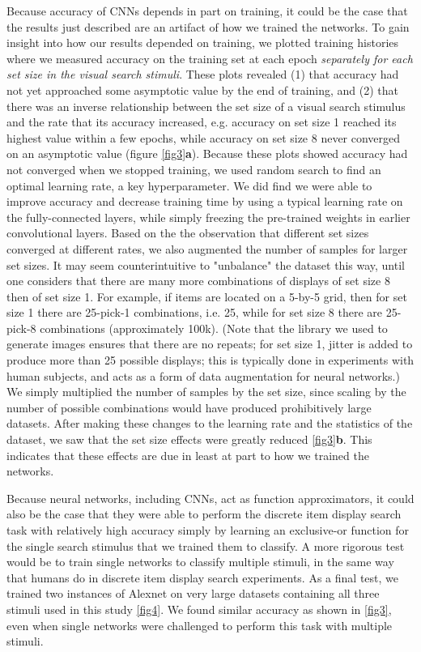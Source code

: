 \documentclass[10pt,letterpaper]{article}
\begin{document}
Because accuracy of CNNs depends in part on training, it could be the case that 
the results just described are an artifact of how we trained the networks. 
To gain insight into how our results depended on training, 
we plotted training histories where we measured accuracy on the training set 
at each epoch \emph{separately for each set size in the visual search stimuli}.
These plots revealed (1) that accuracy had not yet approached some asymptotic 
value by the end of training, and (2) that there was an inverse relationship between 
the set size of a visual search stimulus and the rate that its accuracy increased, 
e.g. accuracy on set size 1 reached its highest value within a few epochs, while accuracy on 
set size 8 never converged on an asymptotic value (figure \ref{fig3}\textbf{a}).
Because these plots showed accuracy had not converged when we stopped training, we 
used random search to find an optimal learning rate, a key hyperparameter.
We did find we were able to improve accuracy and decrease training time by 
using a typical learning rate on the fully-connected layers, while simply 
freezing the pre-trained weights in earlier convolutional layers.
Based on the the observation that different set sizes converged at different rates, we 
also augmented the number of samples for larger set sizes.
It may seem counterintuitive to "unbalance" the dataset this way, until one considers 
that there are many more combinations of displays of set size 8 then of set size 1. 
For example, if items are located on a 5-by-5 grid, then for set size 1 there are 25-pick-1
combinations, i.e. 25,  while for set size 8 there are 25-pick-8 combinations (approximately 100k).
(Note that the library we used to generate images ensures that there are no repeats; for set size 1, 
jitter is added to produce more than 25 possible displays; this is typically done in experiments 
with human subjects, and acts as a form of data augmentation for neural networks.)
We simply multiplied the number of samples by the set size, since scaling 
by the number of possible combinations would have produced prohibitively large datasets.
After making these changes to the learning rate and the statistics of the dataset, 
we saw that the set size effects were greatly reduced \ref{fig3}\textbf{b}. This indicates 
that these effects are due in least at part to how we trained the networks.

Because neural networks, including CNNs, act as function approximators, it could also be the case 
that they were able to perform the discrete item display search task with relatively high 
accuracy simply by learning an exclusive-or function for the single search stimulus that we trained 
them to classify. A more rigorous test would be to train single networks to classify multiple 
stimuli, in the same way that humans do in discrete item display search experiments. 
As a final test, we trained two instances of Alexnet on very large datasets containing 
all three stimuli used in this study \ref{fig4}. We found similar accuracy as shown in \ref{fig3}, 
even when single networks were challenged to perform this task with multiple stimuli.
\end{document}
